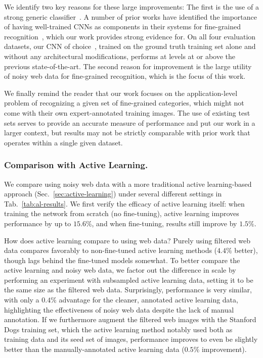 \documentclass[runningheads]{llncs}
\begin{document}
We identify two key reasons for these large improvements:
The first is the use of a strong generic classifier~\cite{szegedy2015rethinking}.
A number of prior works have identified the importance of having well-trained CNNs as components in their systems for fine-grained recognition~\cite{lin2015bilinear,jaderberg2015spatial,krause2015fine,zhang2014part,branson2014bird}, which our work provides strong evidence for.
On all four evaluation datasets, our CNN of choice~\cite{szegedy2015rethinking}, trained on the ground truth training set alone and without any architectural modifications, performs at levels at or above the previous state-of-the-art.
The second reason for improvement is the large utility of noisy web data for fine-grained recognition, which is the focus of this work.

We finally remind the reader that our work focuses on the application-level problem of recognizing a given set of fine-grained categories, which might not come with their own expert-annotated training images.
The use of existing test sets serves to provide an accurate measure of performance and put our work in a larger context, but results may not be strictly comparable with prior work that operates within a single given dataset.






\subsubsection{Comparison with Active Learning.}
We compare using noisy web data with a more traditional active learning-based approach (Sec.~\ref{sec:active-learning}) under several different settings in Tab.~\ref{tab:al-results}.
We first verify the efficacy of active learning itself: when training the network from scratch (\ie no fine-tuning), active learning improves performance by up to $15.6\%$, and when fine-tuning, results still improve by $1.5\%$.

How does active learning compare to using web data?
Purely using filtered web data compares favorably to non-fine-tuned active learning methods ($4.4\%$ better), though lags behind the fine-tuned models somewhat.
To better compare the active learning and noisy web data, we factor out the difference in scale by performing an experiment with subsampled active learning data, setting it to be the same size as the filtered web data.
Surprisingly, performance is very similar, with only a $0.4\%$ advantage for the cleaner, annotated active learning data, highlighting the effectiveness of noisy web data despite the lack of manual annotation.
If we furthermore augment the filtered web images with the Stanford Dogs training set, which the active learning method notably used both as training data and its seed set of images, performance improves to even be slightly better than the manually-annotated active learning data ($0.5\%$ improvement).
\end{document}
